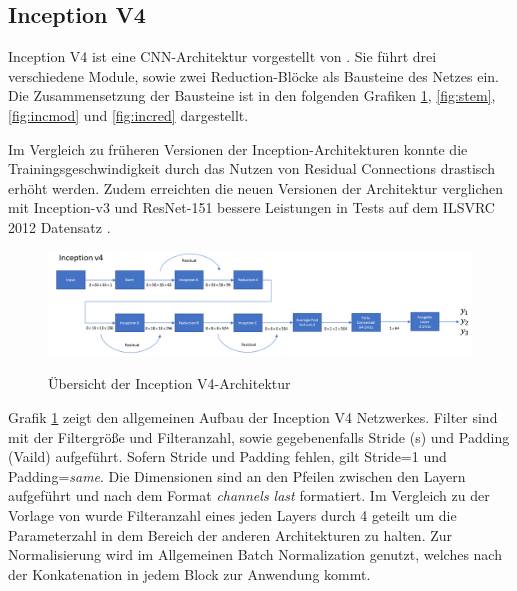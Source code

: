 \subsection{Inception V4}
\label{sek:incv4}
Inception V4 ist eine CNN-Architektur vorgestellt von \textcite{DBLP:journals/corr/SzegedyIV16}. Sie f\"uhrt drei verschiedene Module, sowie zwei Reduction-Bl\"ocke als Bausteine des Netzes ein. Die Zusammensetzung der Bausteine ist in den folgenden Grafiken \ref{fig:incv4}, \ref{fig:stem}, \ref{fig:incmod} und \ref{fig:incred} dargestellt.

Im Vergleich zu früheren Versionen der Inception-Architekturen konnte die Trainingsgeschwindigkeit durch das Nutzen von Residual Connections drastisch erhöht werden. Zudem erreichten die neuen Versionen der Architektur verglichen mit Inception-v3 und ResNet-151 bessere Leistungen in Tests auf dem ILSVRC 2012 Datensatz \parencite{DBLP:journals/corr/SzegedyIV16}.

\begin{figure}
\centering
\caption[Caption for LOF]{Übersicht der Inception V4-Architektur}
\includegraphics[scale=0.75]{pictures/Inception/InceptionV4}
\label{fig:incv4}
\end{figure}

Grafik \ref{fig:incv4} zeigt den allgemeinen Aufbau der Inception V4 Netzwerkes. Filter sind mit der Filtergröße und Filteranzahl, sowie gegebenenfalls Stride (s) und Padding (Vaild) aufgeführt. Sofern Stride und Padding fehlen, gilt Stride=1 und Padding=\textit{same}. Die Dimensionen sind an den Pfeilen zwischen den Layern aufgeführt und nach dem Format \textit{channels last} formatiert. Im Vergleich zu der Vorlage von \textcite{DBLP:journals/corr/SzegedyIV16} wurde Filteranzahl eines jeden Layers durch 4 geteilt um die Parameterzahl in dem Bereich der anderen Architekturen zu halten. Zur Normalisierung wird im Allgemeinen Batch Normalization genutzt, welches nach der Konkatenation in jedem Block zur Anwendung kommt. 

